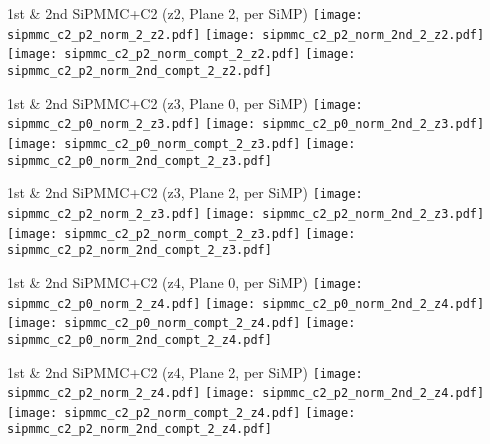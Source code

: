 \documentclass{beamer}
\begin{document}
\begin{frame}{1st \& 2nd SiPMMC+C2 (z2, Plane 2, per SiMP)}
	\texttt{[image: sipmmc\_c2\_p2\_norm\_2\_z2.pdf]}
	\texttt{[image: sipmmc\_c2\_p2\_norm\_2nd\_2\_z2.pdf]} \\
	
		\texttt{[image: sipmmc\_c2\_p2\_norm\_compt\_2\_z2.pdf]}
		\texttt{[image: sipmmc\_c2\_p2\_norm\_2nd\_compt\_2\_z2.pdf]}
\end{frame}

\begin{frame}{1st \& 2nd SiPMMC+C2 (z3, Plane 0, per SiMP)}
	\texttt{[image: sipmmc\_c2\_p0\_norm\_2\_z3.pdf]}
	\texttt{[image: sipmmc\_c2\_p0\_norm\_2nd\_2\_z3.pdf]} \\
	
		\texttt{[image: sipmmc\_c2\_p0\_norm\_compt\_2\_z3.pdf]}
		\texttt{[image: sipmmc\_c2\_p0\_norm\_2nd\_compt\_2\_z3.pdf]}
\end{frame}

\begin{frame}{1st \& 2nd SiPMMC+C2 (z3, Plane 2, per SiMP)}
	\texttt{[image: sipmmc\_c2\_p2\_norm\_2\_z3.pdf]}
	\texttt{[image: sipmmc\_c2\_p2\_norm\_2nd\_2\_z3.pdf]} \\
	
		\texttt{[image: sipmmc\_c2\_p2\_norm\_compt\_2\_z3.pdf]}
		\texttt{[image: sipmmc\_c2\_p2\_norm\_2nd\_compt\_2\_z3.pdf]}
\end{frame}

\begin{frame}{1st \& 2nd SiPMMC+C2 (z4, Plane 0, per SiMP)}
	\texttt{[image: sipmmc\_c2\_p0\_norm\_2\_z4.pdf]}
	\texttt{[image: sipmmc\_c2\_p0\_norm\_2nd\_2\_z4.pdf]} \\
	
		\texttt{[image: sipmmc\_c2\_p0\_norm\_compt\_2\_z4.pdf]}
		\texttt{[image: sipmmc\_c2\_p0\_norm\_2nd\_compt\_2\_z4.pdf]}
\end{frame}

\begin{frame}{1st \& 2nd SiPMMC+C2 (z4, Plane 2, per SiMP)}
	\texttt{[image: sipmmc\_c2\_p2\_norm\_2\_z4.pdf]}
	\texttt{[image: sipmmc\_c2\_p2\_norm\_2nd\_2\_z4.pdf]} \\
	
		\texttt{[image: sipmmc\_c2\_p2\_norm\_compt\_2\_z4.pdf]}
		\texttt{[image: sipmmc\_c2\_p2\_norm\_2nd\_compt\_2\_z4.pdf]}
\end{frame}
\end{document}
